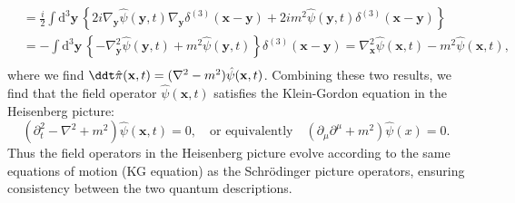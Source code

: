 \[\begin{aligned}
                                       & = \frac{i}{2} \int \mathrm{d}^3 \mathbf{y} \, \left\{ 2i \nabla_{\mathbf{y}}\hat{\psi}(\mathbf{y},t) \nabla_{\mathbf{y}} \delta^{(3)}(\mathbf{x}-\mathbf{y}) + 2i m^2 \hat{\psi}(\mathbf{y},t)\delta^{(3)}(\mathbf{x}-\mathbf{y}) \right\}                                                                                                              \\
                                       & = - \int \mathrm{d}^3 \mathbf{y} \, \left\{ - \nabla_{\mathbf{y}}^2 \hat{\psi}(\mathbf{y},t) + m^2 \hat{\psi}(\mathbf{y},t) \right\} \delta^{(3)}(\mathbf{x}-\mathbf{y}) = \nabla_{\mathbf{x}}^2 \hat{\psi}(\mathbf{x},t) - m^2 \hat{\psi}(\mathbf{x},t),                                                                                               \\
    \end{aligned}
\]
where we find \(\ddt \hat{\pi} (\mathbf{x}, t) = (\nabla^2 - m^2) \hat{\psi}(\mathbf{x}, t)\). Combining these two results, we find that the field operator \(\hat{\psi}(\mathbf{x}, t)\) satisfies the Klein-Gordon equation in the Heisenberg picture:
\[
    (\partial_t^2 - \nabla^2 + m^2) \hat{\psi}(\mathbf{x}, t) = 0, \quad \text{or equivalently} \quad (\partial_{\mu} \partial^{\mu} + m^2) \hat{\psi}(x) = 0.
\]
Thus the field operators in the Heisenberg picture evolve according to the same equations of motion (KG equation) as the Schrödinger picture operators, ensuring consistency between the two quantum descriptions.


